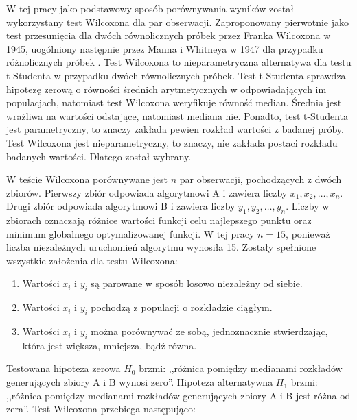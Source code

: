 \documentclass[a4paper,onecolumn,oneside,12pt,wide,floatssmall]{mwrep}
\theoremstyle{definition}
\theoremstyle{plain}%
\theoremstyle{remark}
\begin{document}
W tej pracy jako podstawowy sposób porównywania wyników został wykorzystany test 
Wilcoxona dla par obserwacji. Zaproponowany pierwotnie jako test przesunięcia dla dwóch równolicznych 
próbek przez Franka Wilcoxona w 1945, uogólniony następnie przez Manna i Whitneya w 1947
dla przypadku różnolicznych próbek \cite{mann}. Test Wilcoxona to nieparametryczna alternatywa dla testu t-Studenta w 
przypadku dwóch równolicznych próbek. Test t-Studenta sprawdza hipotezę zerową o równości
średnich arytmetycznych w odpowiadających im populacjach, natomiast test Wilcoxona
weryfikuje równość median. Średnia jest wrażliwa na wartości odstające,
natomiast mediana nie. Ponadto, test t-Studenta jest parametryczny, to znaczy zakłada pewien rozkład
wartości z badanej próby. Test Wilcoxona jest nieparametryczny, to znaczy,
nie zakłada postaci rozkładu badanych wartości. Dlatego został wybrany.

W teście Wilcoxona porównywane jest $n$ par obserwacji, pochodzących z dwóch zbiorów. 
Pierwszy zbiór odpowiada algorytmowi A i zawiera
liczby $x_1, x_2, \dots, x_{n}$. 
Drugi zbiór odpowiada algorytmowi B i zawiera 
liczby $y_1, y_2, \dots, y_{n}$. 
Liczby w zbiorach oznaczają różnice wartości funkcji celu najlepszego punktu oraz minimum globalnego
optymalizowanej funkcji. 
W tej pracy $n=15$,
ponieważ liczba niezależnych uruchomień algorytmu wynosiła 15.
Zostały spełnione wszystkie założenia dla testu Wilcoxona:

\begin{enumerate}
 \item Wartości $x_i$ i $y_i$ są parowane w sposób losowo niezależny od siebie. 
 \item Wartości $x_i$ i $y_i$ pochodzą z populacji o rozkładzie ciągłym.
 \item Wartości $x_i$ i $y_i$ można porównywać ze sobą, jednoznacznie stwierdzając,
która jest większa, mniejsza,
bądź równa.
\end{enumerate}

Testowana hipoteza zerowa $H_0$ brzmi: ,,różnica pomiędzy medianami rozkładów generujących zbiory A i B wynosi zero''.
Hipoteza alternatywna $H_1$ brzmi: ,,różnica pomiędzy medianami rozkładów generujących zbiory A i B jest różna od zera''.
Test Wilcoxona przebiega następująco:
\end{document}
